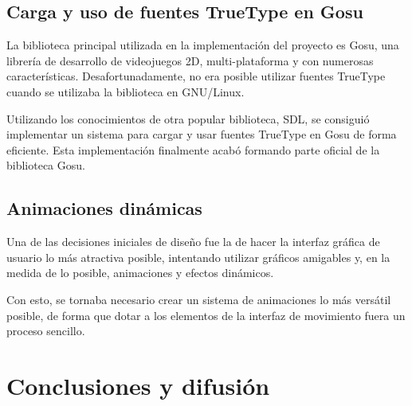 \documentclass[a4paper,11pt]{article}
\begin{document}
\subsection{Carga y uso de fuentes TrueType en Gosu}
La biblioteca principal utilizada en la implementación del proyecto es Gosu, una
librería de desarrollo de videojuegos 2D, multi-plataforma y con numerosas
características. Desafortunadamente, no era posible utilizar fuentes TrueType
cuando se utilizaba la biblioteca en GNU/Linux.

Utilizando los conocimientos de otra popular biblioteca, SDL, se consiguió
implementar un sistema para cargar y usar fuentes TrueType en Gosu de forma
eficiente. Esta implementación finalmente acabó formando parte oficial de la
biblioteca Gosu.

\subsection{Animaciones dinámicas}
Una de las decisiones iniciales de diseño fue la de hacer la interfaz gráfica de
usuario lo más atractiva posible, intentando utilizar gráficos amigables y, en
la medida de lo posible, animaciones y efectos dinámicos.

Con esto, se tornaba necesario crear un sistema de animaciones lo más versátil
posible, de forma que dotar a los elementos de la interfaz de movimiento fuera
un proceso sencillo. 



\section{Conclusiones y difusión}
\end{document}
